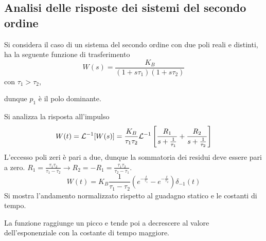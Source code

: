 
\subsection{Analisi delle risposte dei sistemi del secondo ordine}
\label{sec:analisi_secondo_ordine}
Si considera il caso di un sistema del secondo ordine con due poli reali e
distinti, ha la seguente funzione di trasferimento
$$
W(s) =\frac{K_B}{(1+s\tau_1)(1+s\tau_2)}
$$
con $\tau_1 > \tau_2$,
\begin{figure}[h]
 \centering
\end{figure}
dunque $p_1$ è il polo dominante.

Si analizza la risposta all'impulso
$$
W(t) = \mathcal{L}^{-1}[W(s)] =
\frac{K_B}{\tau_1\tau_2}\mathcal{L}^{-1}\left[\frac{R_1}{s+\frac{1}{\tau_1}} +
\frac{R_2}{s+\frac{1}{\tau_2}}\right]
$$
L'eccesso poli zeri è pari a due, dunque la sommatoria dei residui deve essere
pari a zero. $R_1 = \frac{\tau_1\tau_2}{\tau_1-\tau_2} \rightarrow R_2 = -R_1 =
\frac{\tau_1\tau_2}{\tau_2-\tau_1}$.
$$
W(t) =
K_B\frac{1}{\tau_1-\tau_2}\left(e^{-\frac{t}{\tau_1}}-e^{-\frac{t}{\tau_2}}
\right)\delta_{-1}(t)
$$
Si mostra l'andamento normalizzato rispetto al guadagno statico e le costanti
di tempo.
\begin{figure}[h]
 \centering
\end{figure}
La funzione raggiunge un picco e tende poi a decrescere al valore
dell'esponenziale
con la costante di tempo maggiore.

